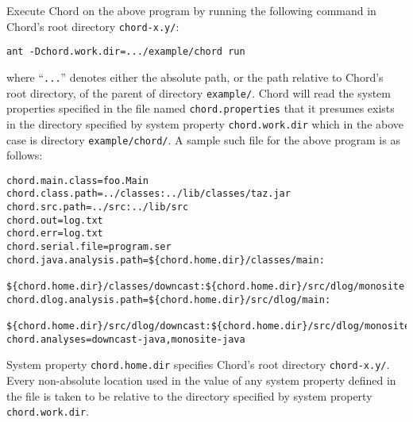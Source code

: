 \documentclass{article}
\begin{document}
Execute Chord on the above program by running the
following command in Chord's root directory {\tt chord-x.y/}:

\begin{verbatim}
ant -Dchord.work.dir=.../example/chord run
\end{verbatim}

where ``{\tt ...}'' denotes either the absolute path, or the path relative to Chord's root directory,
of the parent of directory {\tt example/}.
Chord will read the system properties specified in the file named {\tt chord.properties}
that it presumes exists in the directory specified
by system property {\tt chord.work.dir}
which in the above case is directory {\tt example/chord/}.
A sample such file for the above program is as follows:

\begin{verbatim}
chord.main.class=foo.Main
chord.class.path=../classes:../lib/classes/taz.jar
chord.src.path=../src:../lib/src
chord.out=log.txt
chord.err=log.txt
chord.serial.file=program.ser
chord.java.analysis.path=${chord.home.dir}/classes/main:
    ${chord.home.dir}/classes/downcast:${chord.home.dir}/src/dlog/monosite
chord.dlog.analysis.path=${chord.home.dir}/src/dlog/main:
    ${chord.home.dir}/src/dlog/downcast:${chord.home.dir}/src/dlog/monosite
chord.analyses=downcast-java,monosite-java
\end{verbatim}

System property {\tt chord.home.dir} specifies Chord's root directory
{\tt chord-x.y/}.
Every non-absolute location used in the value of any system property defined in the file
is taken to be relative to the directory specified by system
property {\tt chord.work.dir}.
\end{document}

